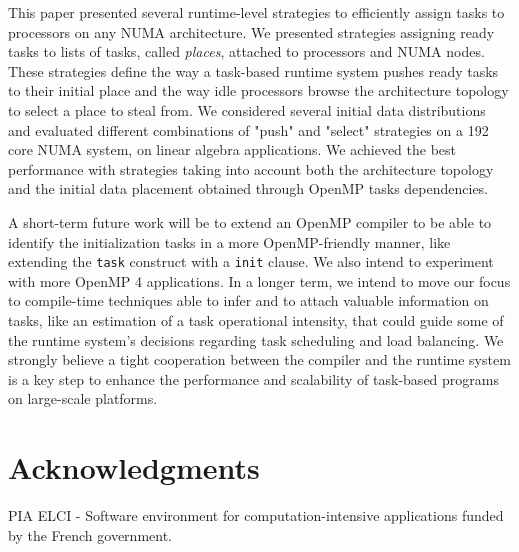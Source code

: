 \documentclass[parallelisme]{compas2016}
\begin{document}
This paper presented several runtime-level strategies to efficiently assign tasks to processors on any NUMA architecture. We presented strategies assigning ready tasks to lists of tasks, called \emph{places}, attached to processors and NUMA nodes. These strategies define the way a task-based runtime system pushes ready tasks to their initial place and the way idle processors browse the architecture topology to select a place to steal from. We considered several initial data distributions and evaluated different combinations of "push" and "select" strategies on a 192 core NUMA system, on linear algebra applications. We achieved the best performance with strategies taking into account both the architecture topology and the initial data placement obtained through OpenMP tasks dependencies.

A short-term future work will be to extend an OpenMP compiler to be able to identify the initialization tasks in a more OpenMP-friendly manner, like extending the \verb!task! construct with a \verb!init! clause. We also intend to experiment with more OpenMP 4 applications.
In a longer term, we intend to move our focus to compile-time techniques able to infer and to attach valuable information on tasks, like an estimation of a task operational intensity, that could guide some of the runtime system's decisions regarding task scheduling and load balancing. We strongly believe a tight cooperation between the compiler and the runtime system is a key step to enhance the performance and scalability of task-based programs on large-scale platforms.

\vspace*{-2ex}
\section*{Acknowledgments}

PIA ELCI - Software environment for computation-intensive applications funded by the French government.


\end{document}
